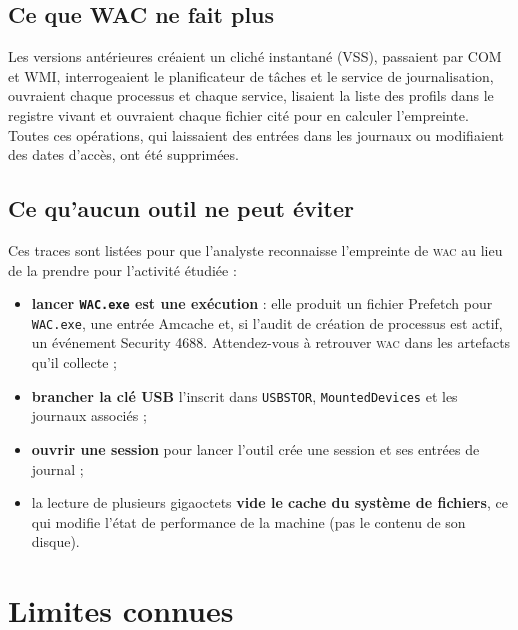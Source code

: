 \documentclass[11pt,a4paper,oneside]{report}
\newcommand{\wac}{\textsc{wac}}
\newcommand{\fichier}[1]{\texttt{#1}}
\begin{document}
\section{Ce que WAC ne fait plus}

Les versions antérieures créaient un cliché instantané (VSS), passaient par COM et
WMI, interrogeaient le planificateur de tâches et le service de journalisation,
ouvraient chaque processus et chaque service, lisaient la liste des profils dans
le registre vivant et ouvraient chaque fichier cité pour en calculer
l'empreinte. Toutes ces opérations, qui laissaient des entrées dans les journaux
ou modifiaient des dates d'accès, ont été supprimées.

\section{Ce qu'aucun outil ne peut éviter}

Ces traces sont listées pour que l'analyste reconnaisse l'empreinte de \wac{} au
lieu de la prendre pour l'activité étudiée :

\begin{itemize}
  \item \textbf{lancer \fichier{WAC.exe} est une exécution} : elle produit un
        fichier Prefetch pour \fichier{WAC.exe}, une entrée Amcache et, si
        l'audit de création de processus est actif, un événement Security 4688.
        Attendez-vous à retrouver \wac{} dans les artefacts qu'il collecte ;
  \item \textbf{brancher la clé USB} l'inscrit dans \fichier{USBSTOR},
        \fichier{MountedDevices} et les journaux associés ;
  \item \textbf{ouvrir une session} pour lancer l'outil crée une session et ses
        entrées de journal ;
  \item la lecture de plusieurs gigaoctets \textbf{vide le cache du système de
        fichiers}, ce qui modifie l'état de performance de la machine (pas le
        contenu de son disque).
\end{itemize}

\chapter{Limites connues}
\end{document}
